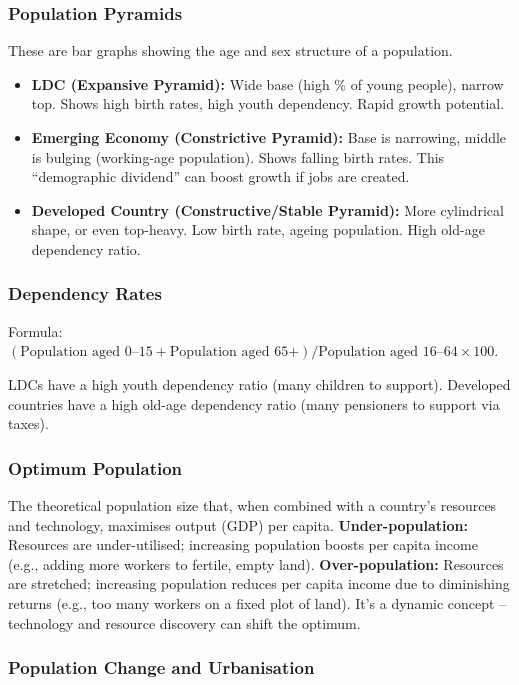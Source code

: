 \documentclass[11pt, a4paper, twoside]{book}
\begin{document}
\subsubsection{Population Pyramids}

These are bar graphs showing the age and sex structure of a population.
\begin{itemize}
  \item \textbf{LDC (Expansive Pyramid):} Wide base (high \% of young people), narrow top. Shows high birth rates, high youth dependency. Rapid growth potential.
  \item \textbf{Emerging Economy (Constrictive Pyramid):} Base is narrowing, middle is bulging (working-age population). Shows falling birth rates. This ``demographic dividend'' can boost growth if jobs are created.
  \item \textbf{Developed Country (Constructive/Stable Pyramid):} More cylindrical shape, or even top-heavy. Low birth rate, ageing population. High old-age dependency ratio.
\end{itemize}

\subsubsection{Dependency Rates}

Formula: $(\text{Population aged 0--15} + \text{Population aged 65+}) / \text{Population aged 16--64} \times 100$.

LDCs have a high youth dependency ratio (many children to support). Developed countries have a high old-age dependency ratio (many pensioners to support via taxes).

\subsubsection{Optimum Population}

The theoretical population size that, when combined with a country's resources and technology, maximises output (GDP) per capita. \textbf{Under-population:} Resources are under-utilised; increasing population boosts per capita income (e.g., adding more workers to fertile, empty land). \textbf{Over-population:} Resources are stretched; increasing population reduces per capita income due to diminishing returns (e.g., too many workers on a fixed plot of land). It's a dynamic concept -- technology and resource discovery can shift the optimum.

\subsubsection{Population Change and Urbanisation}
\end{document}
